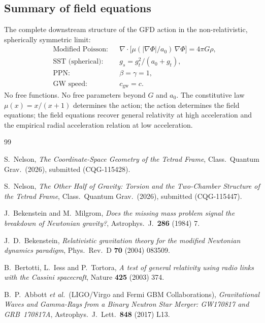\documentclass[11pt]{article}
\begin{document}
\subsection*{Summary of field equations}

The complete downstream structure of the GFD action in
the non-relativistic, spherically symmetric limit:
\begin{align}
  &\text{Modified Poisson:} &
    &\nabla\!\cdot\!\bigl[
      \mu(|\nabla\Phi|/a_0)\,\nabla\Phi
    \bigr] = 4\pi G\rho,
    \label{eq:summary_poisson} \\[4pt]
  &\text{SST (spherical):} &
    &g_s = g_t^2/(a_0 + g_t),
    \label{eq:summary_sst} \\[4pt]
  &\text{PPN:} &
    &\beta = \gamma = 1,
    \label{eq:summary_ppn} \\[4pt]
  &\text{GW speed:} &
    &c_{\text{gw}} = c.
    \label{eq:summary_gw}
\end{align}
No free functions.  No free parameters beyond $G$ and
$a_0$.  The constitutive law $\mu(x) = x/(x{+}1)$
determines the action; the action determines the field
equations; the field equations recover general relativity
at high acceleration and the empirical radial
acceleration relation at low acceleration.


\begin{thebibliography}{99}

S.~Nelson,
\textit{The Coordinate-Space Geometry of the Tetrad
Frame},
Class.\ Quantum Grav.\ (2026), submitted (CQG-115428).

S.~Nelson,
\textit{The Other Half of Gravity: Torsion and the
Two-Chamber Structure of the Tetrad Frame},
Class.\ Quantum Grav.\ (2026), submitted (CQG-115447).

J.~Bekenstein and M.~Milgrom,
\textit{Does the missing mass problem signal the breakdown
of Newtonian gravity?},
Astrophys.\ J.\ \textbf{286} (1984) 7.

J.~D.~Bekenstein,
\textit{Relativistic gravitation theory for the modified
Newtonian dynamics paradigm},
Phys.\ Rev.\ D \textbf{70} (2004) 083509.

B.~Bertotti, L.~Iess and P.~Tortora,
\textit{A test of general relativity using radio links
with the Cassini spacecraft},
Nature \textbf{425} (2003) 374.

B.~P.~Abbott \textit{et al.}\ (LIGO/Virgo and
Fermi GBM Collaborations),
\textit{Gravitational Waves and Gamma-Rays from a Binary
Neutron Star Merger: GW170817 and GRB~170817A},
Astrophys.\ J.\ Lett.\ \textbf{848} (2017) L13.

\end{thebibliography}
\end{document}
